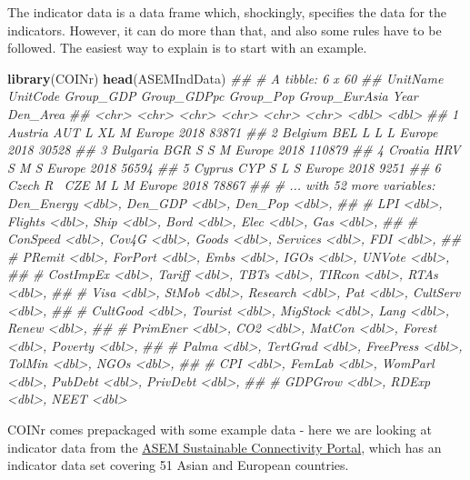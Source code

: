 \documentclass[
]{book}
\newenvironment{Shaded}{\begin{snugshade}}{\end{snugshade}}
\newcommand{\CommentTok}[1]{\textcolor[rgb]{0.56,0.35,0.01}{\textit{#1}}}
\newcommand{\KeywordTok}[1]{\textcolor[rgb]{0.13,0.29,0.53}{\textbf{#1}}}
\newcommand{\NormalTok}[1]{#1}
\begin{document}
The indicator data is a data frame which, shockingly, specifies the data for the indicators. However, it can do more than that, and also some rules have to be followed. The easiest way to explain is to start with an example.

\begin{Shaded}
\begin{Highlighting}[]
\KeywordTok{library}\NormalTok{(COINr)}
\KeywordTok{head}\NormalTok{(ASEMIndData)}
\CommentTok{## # A tibble: 6 x 60}
\CommentTok{##   UnitName UnitCode Group_GDP Group_GDPpc Group_Pop Group_EurAsia  Year Den_Area}
\CommentTok{##   <chr>    <chr>    <chr>     <chr>       <chr>     <chr>         <dbl>    <dbl>}
\CommentTok{## 1 Austria  AUT      L         XL          M         Europe         2018    83871}
\CommentTok{## 2 Belgium  BEL      L         L           L         Europe         2018    30528}
\CommentTok{## 3 Bulgaria BGR      S         S           M         Europe         2018   110879}
\CommentTok{## 4 Croatia  HRV      S         M           S         Europe         2018    56594}
\CommentTok{## 5 Cyprus   CYP      S         L           S         Europe         2018     9251}
\CommentTok{## 6 Czech R~ CZE      M         L           M         Europe         2018    78867}
\CommentTok{## # ... with 52 more variables: Den_Energy <dbl>, Den_GDP <dbl>, Den_Pop <dbl>,}
\CommentTok{## #   LPI <dbl>, Flights <dbl>, Ship <dbl>, Bord <dbl>, Elec <dbl>, Gas <dbl>,}
\CommentTok{## #   ConSpeed <dbl>, Cov4G <dbl>, Goods <dbl>, Services <dbl>, FDI <dbl>,}
\CommentTok{## #   PRemit <dbl>, ForPort <dbl>, Embs <dbl>, IGOs <dbl>, UNVote <dbl>,}
\CommentTok{## #   CostImpEx <dbl>, Tariff <dbl>, TBTs <dbl>, TIRcon <dbl>, RTAs <dbl>,}
\CommentTok{## #   Visa <dbl>, StMob <dbl>, Research <dbl>, Pat <dbl>, CultServ <dbl>,}
\CommentTok{## #   CultGood <dbl>, Tourist <dbl>, MigStock <dbl>, Lang <dbl>, Renew <dbl>,}
\CommentTok{## #   PrimEner <dbl>, CO2 <dbl>, MatCon <dbl>, Forest <dbl>, Poverty <dbl>,}
\CommentTok{## #   Palma <dbl>, TertGrad <dbl>, FreePress <dbl>, TolMin <dbl>, NGOs <dbl>,}
\CommentTok{## #   CPI <dbl>, FemLab <dbl>, WomParl <dbl>, PubDebt <dbl>, PrivDebt <dbl>,}
\CommentTok{## #   GDPGrow <dbl>, RDExp <dbl>, NEET <dbl>}
\end{Highlighting}
\end{Shaded}

COINr comes prepackaged with some example data - here we are looking at indicator data from the \href{https://composite-indicators.jrc.ec.europa.eu/asem-sustainable-connectivity/}{ASEM Sustainable Connectivity Portal}, which has an indicator data set covering 51 Asian and European countries.
\end{document}
